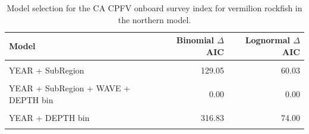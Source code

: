 \documentclass[11pt,
  english,
]{article}
\begin{document}
\FloatBarrier

\begin{table}

\caption{\label{tab:tab-model-select-cpfvonboard}Model selection for the CA CPFV onboard survey index for vermilion rockfish in the northern model.}
\centering
\begin{tabular}[t]{lrr}
\toprule
Model & Binomial $\Delta$AIC & Lognormal $\Delta$AIC\\
\midrule
\cellcolor{gray!6}{1} & \cellcolor{gray!6}{797.52} & \cellcolor{gray!6}{436.25}\\
YEAR + SubRegion & 129.05 & 60.03\\
\cellcolor{gray!6}{YEAR + SubRegion + WAVE} & \cellcolor{gray!6}{120.54} & \cellcolor{gray!6}{58.72}\\
YEAR + SubRegion + WAVE + DEPTH bin & 0.00 & 0.00\\
\cellcolor{gray!6}{YEAR + WAVE + DEPTH bin} & \cellcolor{gray!6}{285.69} & \cellcolor{gray!6}{66.16}\\
\addlinespace
YEAR + DEPTH bin & 316.83 & 74.00\\
\cellcolor{gray!6}{YEAR + SubRegion + DEPTH bin} & \cellcolor{gray!6}{10.87} & \cellcolor{gray!6}{6.06}\\
\bottomrule
\end{tabular}
\end{table}

\FloatBarrier
\end{document}
